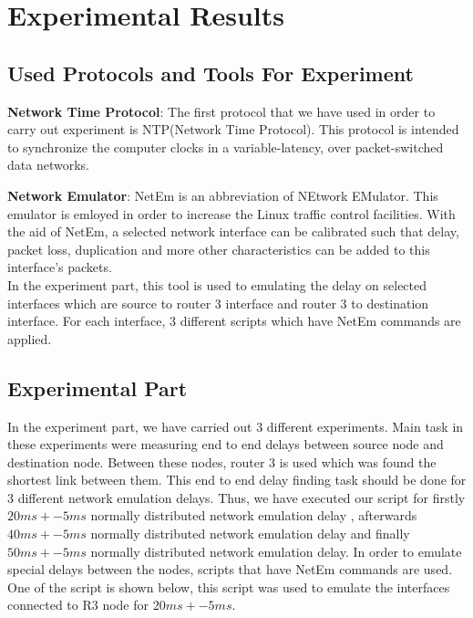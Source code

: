 \documentclass[conference]{IEEEtran}
\begin{document}
\section{Experimental Results}
\subsection{Used Protocols and Tools For Experiment}
\textbf{Network Time Protocol}:
The first protocol that we have used in order to carry out experiment is NTP(Network Time Protocol).
This protocol is intended to synchronize the computer clocks in a variable-latency, over packet-switched data networks. 

\textbf{Network Emulator}:
NetEm is an abbreviation of NEtwork EMulator. This emulator is emloyed in order to increase the Linux traffic control facilities. With the aid of NetEm, a selected network interface can be calibrated such that delay, packet loss, duplication and more other characteristics can be added to this interface's packets.\\
In the experiment part, this tool is used to emulating the delay on selected interfaces which are source to router 3 interface and router 3 to destination interface. For each interface, 3 different scripts  which have NetEm commands are applied. 

\subsection{Experimental Part}

In the experiment part, we have carried out 3 different experiments. Main task in these experiments were measuring end to end delays between source node and destination node. Between these nodes, router 3 is used which was found the shortest link between them. This end to end delay finding task should be done for 3 different network emulation delays. Thus, we have executed our script for firstly $20ms +-5ms$ normally distributed network emulation delay , afterwards $40ms +-5ms$ normally distributed network emulation delay and finally $50ms +-5ms$ normally distributed network emulation delay. In order to emulate special delays between the nodes, scripts that have NetEm commands are used. One of the script is shown below, this script was used to emulate the interfaces connected to R3 node for $20ms +- 5ms$. \\
\end{document}
